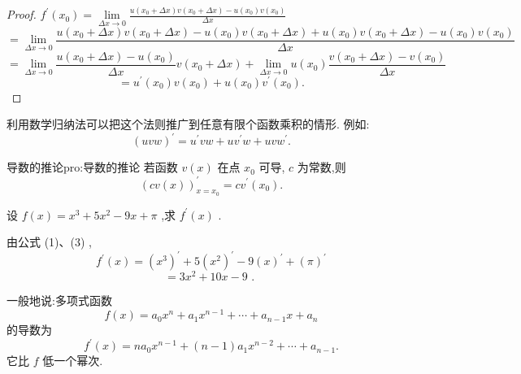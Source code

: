 \begin{proof}
\({f}^{\prime }\left( {x}_{0}\right)  = \mathop{\lim }\limits_{{{\Delta x} \rightarrow  0}}\frac{u\left( {{x}_{0} + {\Delta x}}\right) v\left( {{x}_{0} + {\Delta x}}\right)  - u\left( {x}_{0}\right) v\left( {x}_{0}\right) }{\Delta x}\)
\[
= \mathop{\lim }\limits_{{{\Delta x} \rightarrow  0}}\frac{u\left( {{x}_{0} + {\Delta x}}\right) v\left( {{x}_{0} + {\Delta x}}\right)  - u\left( {x}_{0}\right) v\left( {{x}_{0} + {\Delta x}}\right)  + u\left( {x}_{0}\right) v\left( {{x}_{0} + {\Delta x}}\right)  - u\left( {x}_{0}\right) v\left( {x}_{0}\right) }{\Delta x}
\]
\[
= \mathop{\lim }\limits_{{{\Delta x} \rightarrow  0}}\frac{u\left( {{x}_{0} + {\Delta x}}\right)  - u\left( {x}_{0}\right) }{\Delta x}v\left( {{x}_{0} + {\Delta x}}\right)  + \mathop{\lim }\limits_{{{\Delta x} \rightarrow  0}}u\left( {x}_{0}\right) \frac{v\left( {{x}_{0} + {\Delta x}}\right)  - v\left( {x}_{0}\right) }{\Delta x}
\]
\[
= {u}^{\prime }\left( {x}_{0}\right) v\left( {x}_{0}\right)  + u\left( {x}_{0}\right) {v}^{\prime }\left( {x}_{0}\right) .
\]
\end{proof}

利用数学归纳法可以把这个法则推广到任意有限个函数乘积的情形. 例如:
\[
{\left( uvw\right) }^{\prime } = {u}^{\prime }{vw} + u{v}^{\prime }w + {uv}{w}^{\prime }.
\]

\begin{corollary}{导数的推论}{pro:导数的推论}
若函数 \(v\left( x\right)\) 在点 \({x}_{0}\) 可导, \(c\) 为常数,则
\[
{\left( cv\left( x\right) \right) }_{x = {x}_{0}}^{\prime } = c{v}^{\prime }\left( {x}_{0}\right) . \tag{3}
\]
\end{corollary}

\begin{example}
设 \(f\left( x\right)  = {x}^{3} + 5{x}^{2} - {9x} + \pi\) ,求 \({f}^{\prime }\left( x\right)\) .
\end{example}


\begin{solution}
由公式 (1)、(3) ,
\[
{f}^{\prime }\left( x\right)  = {\left( {x}^{3}\right) }^{\prime } + 5{\left( {x}^{2}\right) }^{\prime } - 9{\left( x\right) }^{\prime } + {\left( \pi \right) }^{\prime }
\]
\[
= 3{x}^{2} + {10x} - 9\text{ . }
\]
\end{solution}

一般地说:多项式函数
\[
f\left( x\right)  = {a}_{0}{x}^{n} + {a}_{1}{x}^{n - 1} + \cdots  + {a}_{n - 1}x + {a}_{n}
\]
的导数为
\[
{f}^{\prime }\left( x\right)  = n{a}_{0}{x}^{n - 1} + \left( {n - 1}\right) {a}_{1}{x}^{n - 2} + \cdots  + {a}_{n - 1}.
\]
它比 \(f\) 低一个幂次.


